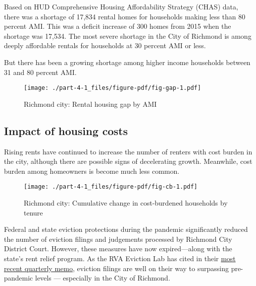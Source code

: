 \documentclass[
  letterpaper,
  DIV=11,
  numbers=noendperiod]{scrreprt}
\begin{document}
Based on HUD Comprehensive Housing Affordability Strategy (CHAS) data,
there was a shortage of 17,834 rental homes for households making less
than 80 percent AMI. This was a deficit increase of 300 homes from 2015
when the shortage was 17,534. The most severe shortage in the City of
Richmond is among deeply affordable rentals for households at 30 percent
AMI or less.

But there has been a growing shortage among higher income households
between 31 and 80 percent AMI.

\begin{figure}

{\centering \texttt{[image: ./part-4-1\_files/figure-pdf/fig-gap-1.pdf]}

}

\caption{\label{fig-gap}Richmond city: Rental housing gap by AMI}

\end{figure}

\hypertarget{impact-of-housing-costs}{%
\subsection{Impact of housing costs}\label{impact-of-housing-costs}}

Rising rents have continued to increase the number of renters with cost
burden in the city, although there are possible signs of decelerating
growth. Meanwhile, cost burden among homeowners is become much less
common.

\begin{figure}

{\centering \texttt{[image: ./part-4-1\_files/figure-pdf/fig-cb-1.pdf]}

}

\caption{\label{fig-cb}Richmond city: Cumulative change in cost-burdened
households by tenure}

\end{figure}

Federal and state eviction protections during the pandemic significantly
reduced the number of eviction filings and judgements processed by
Richmond City District Court. However, these measures have now
expired---along with the state's rent relief program. As the RVA
Eviction Lab has cited in their
\href{https://rampages.us/rvaevictionlab/2022/10/31/2nd-3rd-quarter-2022-report-memo/}{most
recent quarterly memo}, eviction filings are well on their way to
surpassing pre-pandemic levels --- especially in the City of Richmond.
\end{document}
